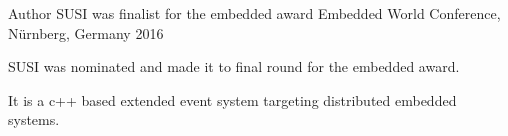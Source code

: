 \begin{cventries}

\cventry
{Author} %
{SUSI was finalist for the embedded award} %
{Embedded World Conference, Nürnberg, Germany} %
{2016} %
{ %
\begin{cvitems}
\item {SUSI was nominated and made it to final round for the embedded award.}
\item {It is a c++ based extended event system targeting distributed embedded systems.}
\end{cvitems}
}

\end{cventries}
